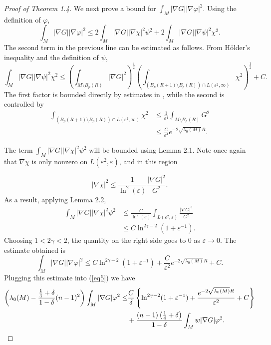 \documentclass{amsart}
\theoremstyle{definition}
\theoremstyle{remark}
\numberwithin{equation}{section}
\begin{document}
\begin{proof}[Proof of Theorem 1.4]
We next prove a bound for $\int_M|\nabla G||\nabla \varphi|^2$. Using the definition of $\varphi$, 
\begin{equation*}
\int_M|\nabla G||\nabla\varphi|^2\leq 2\int_M|\nabla G||\nabla\chi|^2\psi^2+2\int_M|\nabla G||\nabla\psi|^2\chi^2.
\end{equation*}
The second term in the previous line can be estimated as follows. From H\"older's inequality and the definition of $\psi$,
\begin{equation*}
\int_M|\nabla G||\nabla\psi|^2\chi^2\leq\left(\int_{M\setminus B_p(R)}|\nabla G|^2\right)^{\frac{1}{2}}\left(\int_{(B_p(R+1)\setminus B_p(R))\cap L(\varepsilon^2,\infty)}\chi^2\right)^{\frac{1}{2}}+C.
\end{equation*}
The first factor is bounded directly by estimates in \cite{LW}, while the second is controlled by
\begin{align*}
\int_{(B_p(R+1)\setminus B_p(R))\cap L(\varepsilon^2,\infty)}\chi^2 &\leq \frac{1}{\varepsilon^4}\int_{M\setminus B_p(R)}G^2\\
&\leq \frac{C}{\varepsilon^4}e^{-2\sqrt{\lambda_0(M)}R}.
\end{align*}

The term $\int_M |\nabla G||\nabla \chi|^2\psi^2$ will be bounded using Lemma 2.1. Note once again that $\nabla \chi$ is only nonzero on $L(\varepsilon^2,\varepsilon)$, and in this region

\begin{equation*}
|\nabla \chi|^2 \leq \frac{1}{\ln^2(\varepsilon)}\frac{|\nabla G|^2}{G^2}.
\end{equation*}
As a result, applying Lemma 2.2,
\begin{align*}
\int_M|\nabla G||\nabla \chi|^2\psi^2 &\leq \frac{C}{\ln^2(\varepsilon)}\int_{L(\varepsilon^2,\varepsilon)} \frac{|\nabla G|^3}{G^2}\\
& \leq C\ln^{2\gamma - 2}(1+\varepsilon^{-1}).
\end{align*}
Choosing $1<2\gamma<2$, the quantity on the right side goes to 0 as $\varepsilon\to 0$. The estimate obtained is
\begin{equation*}
\int_M|\nabla G||\nabla\varphi|^2\leq C\ln^{2\gamma -2}(1+\varepsilon^{-1})+\frac{C}{\varepsilon^2}e^{-2\sqrt{\lambda_0(M)}R}+C.
\end{equation*}
Plugging this estimate into (\ref{eq5}) we have
\begin{align}
\left(\lambda_0(M)-\frac{\frac{1}{4}+\delta}{1-\delta}(n-1)^2\right)\int_M|\nabla G|\varphi^2 \leq &\frac{C}{\delta}\left\{\ln^{2\gamma-2}(1+\varepsilon^{-1})+\frac{e^{-2\sqrt{\lambda_0(M)}R}}{\varepsilon^2}+C\right\} \notag\\
& +\frac{(n-1)\left(\frac{1}{4}+\delta \right)}{1-\delta}\int_M w|\nabla G|\varphi^2.\notag
\end{align}


\end{proof}
\end{document}

